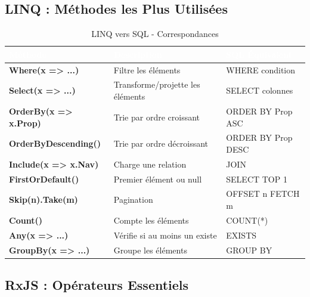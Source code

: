 \documentclass[12pt,a4paper]{article}
\begin{document}
\subsection{LINQ : Méthodes les Plus Utilisées}

\begin{table}[H]
\centering
\small
{}
\begin{tabular}{|>{\bfseries}p{3cm}|p{5cm}|p{5.5cm}|}
\hline
\rowcolor{dotnetpurple}
\textcolor{white}{\textbf{Méthode}} & \textcolor{white}{\textbf{Description}} & \textcolor{white}{\textbf{SQL Équivalent}} \\
\hline
Where(x => ...) & Filtre les éléments & WHERE condition \\
\hline
Select(x => ...) & Transforme/projette les éléments & SELECT colonnes \\
\hline
OrderBy(x => x.Prop) & Trie par ordre croissant & ORDER BY Prop ASC \\
\hline
OrderByDescending() & Trie par ordre décroissant & ORDER BY Prop DESC \\
\hline
Include(x => x.Nav) & Charge une relation & JOIN \\
\hline
FirstOrDefault() & Premier élément ou null & SELECT TOP 1 \\
\hline
Skip(n).Take(m) & Pagination & OFFSET n FETCH m \\
\hline
Count() & Compte les éléments & COUNT(*) \\
\hline
Any(x => ...) & Vérifie si au moins un existe & EXISTS \\
\hline
GroupBy(x => ...) & Groupe les éléments & GROUP BY \\
\hline
\end{tabular}
\caption{LINQ vers SQL - Correspondances}
\end{table}

\subsection{RxJS : Opérateurs Essentiels}
\end{document}
